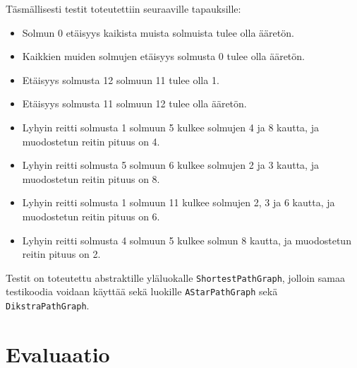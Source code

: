 \documentclass[10pt,a4paper]{article}
\begin{document}
Täsmällisesti testit toteutettiin seuraaville tapauksille:

\begin{itemize}
\item Solmun 0 etäisyys kaikista muista solmuista tulee olla ääretön.
\item Kaikkien muiden solmujen etäisyys solmusta 0 tulee olla ääretön.
\item Etäisyys solmusta 12 solmuun 11 tulee olla 1.
\item Etäisyys solmusta 11 solmuun 12 tulee olla ääretön.
\item Lyhyin reitti solmusta 1 solmuun 5 kulkee solmujen 4 ja 8 kautta, ja muodostetun reitin pituus on 4.
\item Lyhyin reitti solmusta 5 solmuun 6 kulkee solmujen 2 ja 3 kautta, ja muodostetun reitin pituus on 8.
\item Lyhyin reitti solmusta 1 solmuun 11 kulkee solmujen 2, 3 ja 6 kautta, ja muodostetun reitin pituus on 6.
\item Lyhyin reitti solmusta 4 solmuun 5 kulkee solmun 8 kautta, ja muodostetun reitin pituus on 2.
\end{itemize}

Testit on toteutettu abstraktille yläluokalle \texttt{ShortestPathGraph}, jolloin samaa testikoodia voidaan käyttää sekä luokille \texttt{AStarPathGraph} sekä \texttt{DikstraPathGraph}.

\section{Evaluaatio}

 

\end{document}
